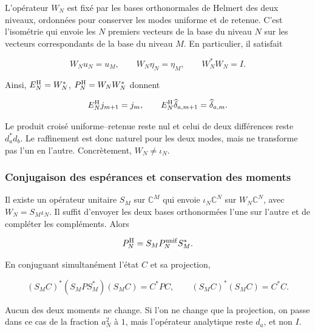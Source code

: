 L'opérateur \(W_N\) est fixé par les bases orthonormales de Helmert
des deux niveaux, ordonnées pour conserver les modes uniforme et de
retenue. C'est l'isométrie qui envoie les \(N\) premiers vecteurs de la
base du niveau \(N\) sur les vecteurs correspondants de la base du niveau \(M\).
En particulier, il satisfait

\begin{equation}
W_Nu_N=u_M,\qquad W_N\eta_N=\eta_M,\qquad W_N^*W_N=I.
\label{viii:gamma-add-display-12}
\end{equation}

Ainsi, \(E_N^{\rm H}=W_N^*\), \(P_N^{\rm H}=W_NW_N^*\) donnent

\begin{equation}
E_N^{\rm H}j_{m+1}=j_m,\qquad
E_N^{\rm H}\widehat\delta_{a,m+1}=\widehat\delta_{a,m}.
\label{viii:gamma-add-eq-5}
\end{equation}

Le produit croisé uniforme--retenue reste nul et celui de deux différences reste \(d_a^*d_b\). Le raffinement est donc naturel pour les deux modes, mais ne transforme pas l'un en l'autre. Concrètement, \(W_N\ne\iota_N\).

\subsubsection{Conjugaison des espérances et conservation des moments}
\label{viii:gamma-add-sub-174}

Il existe un opérateur unitaire \(S_M\) sur \(\mathbb C^M\) qui envoie \(\iota_N\mathbb C^N\) sur \(W_N\mathbb C^N\), avec \(W_N=S_M\iota_N\). Il suffit d'envoyer les deux bases orthonormées l'une sur l'autre et de compléter les compléments. Alors

\begin{equation}
P_N^{\rm H}=S_MP_N^{\rm unif}S_M^*.
\label{viii:gamma-add-display-14}
\end{equation}

En conjuguant simultanément l'état \(C\) et sa projection,

\begin{equation}
(S_MC)^*(S_MP S_M^*)(S_MC)=C^*PC,\qquad
(S_MC)^*(S_MC)=C^*C.
\label{viii:gamma-add-eq-6}
\end{equation}

Aucun des deux moments ne change. Si l'on ne change que la projection, on passe dans ce cas de la fraction \(a_N^2\) à \(1\), mais l'opérateur analytique reste \(d_a\), et non \(I\).

